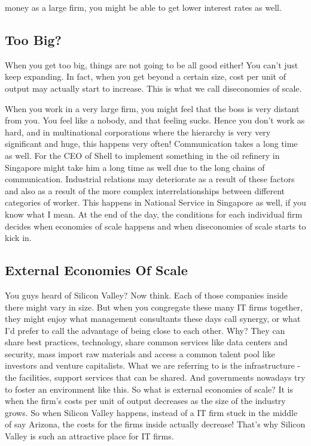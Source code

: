 money as a large firm, you might be able to get lower interest rates as well. 
\subsection{Too Big?}
When you get too big, things are not going to be all good either! You can't just keep expanding. In fact, when you get beyond a certain size, cost per unit of output may actually start to increase. This is what we call diseconomies of scale.

 When you work in a very large firm, you might feel that the boss is very distant from you. You feel like a nobody, and that feeling sucks. Hence you don't work as hard, and in multinational corporations where the hierarchy is very very significant and huge, this happens very often! Communication takes a long time as well. For the CEO of Shell to implement something in the oil refinery in Singapore might take him a long time as well due to the long chains of communication. Industrial relations may deteriorate as a result of these factors and also as a result of the more complex interrelationships between different categories of worker. This happens in National Service in Singapore as well, if you know what I mean. At the end of the day, the conditions for each individual firm decides when economies of scale happens and when diseconomies of scale starts to kick in.
\subsection{External Economies Of Scale}
You guys heard of Silicon Valley? Now think. Each of those companies inside there might vary in size. But when you congregate these many IT firms together, they might enjoy what management consultants these days call synergy, or what I'd prefer to call the advantage of being close to each other. Why? They can share best practices, technology, share common services like data centers and security, mass import raw materials and access a common talent pool like investors and venture capitalists. What we are referring to is the infrastructure - the facilities, support services that can be shared. And governments nowadays try to foster an environment like this. So what is external economies of scale? It is when the firm's costs per unit of output decreases as the size of the industry grows. So when Silicon Valley happens, instead of a IT firm stuck in the middle of say Arizona, the costs for the firms inside actually decrease! That's why Silicon Valley is such an attractive place for IT firms.
